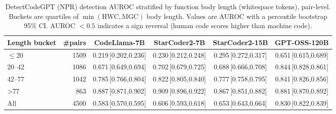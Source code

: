 \begin{table}[t]
\centering
\caption{DetectCodeGPT (NPR) detection AUROC stratified by function body length (whitespace tokens), pair-level. Buckets are quartiles of $\min(\text{HWC},\text{MGC})$ body length. Values are AUROC with a percentile bootstrap 95\% CI. AUROC $<0.5$ indicates a sign reversal (human code scores higher than machine code).}
\label{tab:auroc-by-length}
\begin{tabular}{lrcccc}
\toprule
Length bucket & \#pairs & CodeLlama-7B & StarCoder2-7B & StarCoder2-15B & GPT-OSS-120B \\
\midrule
$\leq$20 & 1509 & 0.219\,\tiny[0.202,0.236] & 0.230\,\tiny[0.212,0.248] & 0.295\,\tiny[0.272,0.317] & 0.651\,\tiny[0.615,0.689] \\
20--42 & 1086 & 0.671\,\tiny[0.649,0.694] & 0.702\,\tiny[0.679,0.725] & 0.688\,\tiny[0.666,0.708] & 0.844\,\tiny[0.828,0.861] \\
42--77 & 1042 & 0.785\,\tiny[0.766,0.804] & 0.822\,\tiny[0.805,0.840] & 0.777\,\tiny[0.758,0.795] & 0.841\,\tiny[0.826,0.856] \\
>77 & 863 & 0.887\,\tiny[0.871,0.902] & 0.909\,\tiny[0.896,0.922] & 0.867\,\tiny[0.851,0.882] & 0.881\,\tiny[0.870,0.892] \\
\midrule
All & 4500 & 0.583\,\tiny[0.570,0.595] & 0.606\,\tiny[0.593,0.618] & 0.653\,\tiny[0.643,0.664] & 0.830\,\tiny[0.822,0.839] \\
\bottomrule
\end{tabular}
\end{table}
